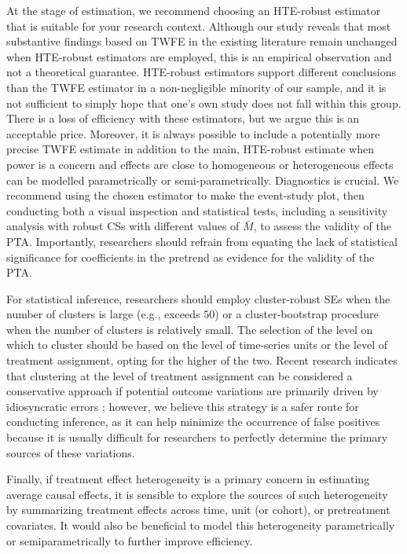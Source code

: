 \documentclass[12pt]{article}
\begin{document}
At the stage of estimation, we recommend choosing an HTE-robust estimator that is suitable for your research context. Although our study reveals that most substantive findings based on TWFE in the existing literature remain unchanged when HTE-robust estimators are employed, this is an empirical observation and not a theoretical guarantee. HTE-robust estimators support different conclusions than the TWFE estimator in a non-negligible minority of our sample, and it is not sufficient to simply hope that one's own study does not fall within this group. There is a loss of efficiency with these estimators, but we argue this is an acceptable price. Moreover, it is always possible to include a potentially more precise TWFE estimate in addition to the main, HTE-robust estimate when power is a concern and effects are close to homogeneous or heterogeneous effects can be modelled parametrically or semi-parametrically. Diagnostics is crucial. We recommend using the chosen estimator to make the event-study plot, then conducting both a visual inspection and statistical tests, including a sensitivity analysis with robust CSs with different values of $\bar M$, to assess the validity of the PTA. Importantly, researchers should refrain from equating the lack of statistical significance for coefficients in the pretrend as evidence for the validity of the PTA.  


For statistical inference, researchers should employ cluster-robust SEs when the number of clusters is large (e.g., exceeds $50$) or a cluster-bootstrap procedure when the number of clusters is relatively small. The selection of the level on which to cluster should be based on the level of time-series units or the level of treatment assignment, opting for the higher of the two. Recent research indicates that clustering at the level of treatment assignment can be considered a conservative approach if potential outcome variations are primarily driven by idiosyncratic errors \citep{abadie2022should}; however, we believe this strategy is a safer route for conducting inference, as it can help minimize the occurrence of false positives because it is usually difficult for researchers to perfectly determine the primary sources of these variations.

Finally, if treatment effect heterogeneity is a primary concern in estimating average causal effects, it is sensible to explore the sources of such heterogeneity by summarizing treatment effects across time, unit (or cohort), or pretreatment covariates. It would also be beneficial to model this heterogeneity parametrically or semiparametrically to further improve efficiency.
\end{document}
